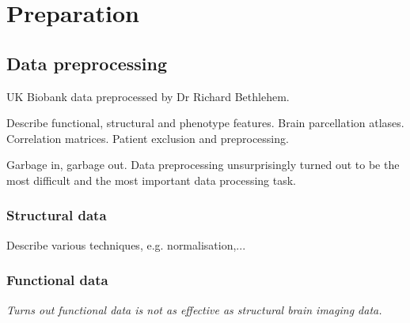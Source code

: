 \documentclass[12pt,a4paper,twoside, openright, hidelinks]{report}
\begin{document}
\chapter{Preparation}

\section{Data preprocessing}
UK Biobank data preprocessed by Dr Richard Bethlehem.

Describe functional, structural and phenotype features. Brain parcellation atlases. Correlation matrices. Patient exclusion and preprocessing.

Garbage in, garbage out. Data preprocessing unsurprisingly turned out to be the most difficult and the most important data processing task.

\subsection{Structural data}
Describe various techniques, e.g. normalisation,...

\subsection{Functional data}
\textit{Turns out functional data is not as effective as structural brain imaging data.}
\end{document}
